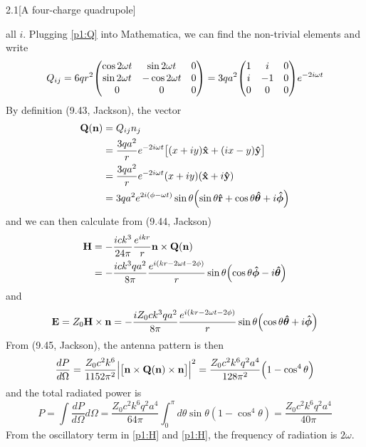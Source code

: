 \documentclass[12pt]{article}
\begin{document}
\begin{problem}{2.1}[A four-charge quadrupole]
\begin{solution}
all $i$. Plugging \eqref{p1:Q} into Mathematica, we can find the non-trivial
elements and write
\begin{equation}
    Q_{ij}=6qr^2\mqty(
    \cos2\omega t & \sin2\omega t & 0\\
    \sin2\omega t & -\cos2\omega t & 0\\
    0 & 0 & 0)=3qa^2\mqty(1&i&0\\i&-1&0\\0&0&0)e^{-2i\omega t}
\end{equation}
By definition (9.43, Jackson), the vector
\begin{align}
    \vb{Q}(\vb{n})
    &= Q_{ij}n_j\notag\\
    &=\frac{3qa^2}{r}e^{-2i\omega t}\qty[(x+iy)\vb{\hat{x}}+(ix-y)\vb{\hat{y}}]\notag\\
    &=\frac{3qa^2}{r}e^{-2i\omega t}(x+iy)(\vb{\hat{x}}+i\vb{\hat{y}})\notag\\
    &=3qa^2e^{2i(\phi-\omega
    t)}\sin\theta\qty(\sin\theta\vb{\hat{r}}+\cos\theta\bm{\hat{\theta}}+i\bm{\hat{\phi}})
\end{align}
and we can then calculate from (9.44, Jackson)
\begin{align}\label{p1:H}
    \vb{H}
    &=-\frac{ick^3}{24\pi}\frac{e^{ikr}}{r}\vb{n}\times\vb{Q}(\vb{n})\notag\\
    &=-\frac{ick^3qa^2}{8\pi}\frac{e^{i(kr-2\omega t-2\phi)}}{r}
    \sin\theta\qty(\cos\theta\bm{\hat{\phi}}-i\bm{\hat{\theta}})
\end{align}
and
\begin{equation}\label{p1:E}
    \vb{E}=Z_0\vb{H}\times\vb{n}
    =-\frac{iZ_0ck^3qa^2}{8\pi}\frac{e^{i(kr-2\omega t-2\phi)}}{r}
    \sin\theta\qty(\cos\theta\bm{\hat{\theta}}+i\bm{\hat{\phi}})
\end{equation}
From (9.45, Jackson), the antenna pattern is then
\begin{equation}
    \frac{dP}{d\Omega}
    =\frac{Z_0c^2k^6}{1152\pi^2}\abs{\qty[\vb{n}\times\vb{Q}(\vb{n})\times\vb{n}]}^2
    =\frac{Z_0c^2k^6q^2a^4}{128\pi^2}\qty(1-\cos^4\theta)
\end{equation}
and the total radiated power is
\begin{equation}
    P=\int\frac{dP}{d\Omega}d\Omega
    =\frac{Z_0c^2k^6q^2a^4}{64\pi}\int_0^\pi d\theta\sin\theta(1-\cos^4\theta)
    =\frac{Z_0c^2k^6q^2a^4}{40\pi}
\end{equation}
From the oscillatory term in \eqref{p1:H} and \eqref{p1:H}, the frequency of 
radiation is $2\omega$.

\end{solution}
\end{problem}
\end{document}
